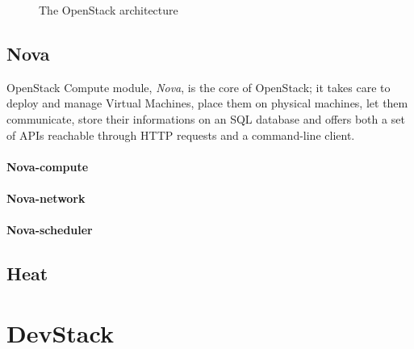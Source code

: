 \begin{figure}[!ht]
\label{fig:openstack_arch}
\caption{The OpenStack architecture}
\end{figure}

\subsection{Nova}
\label{sec:openstack_nova}
OpenStack Compute module, \textit{Nova}, is the core of OpenStack; it takes care to deploy and manage Virtual Machines, place them on physical machines, let them communicate, store their informations on an SQL database and offers both a set of APIs reachable through HTTP requests and a command-line client.

\paragraph{Nova-compute}
\paragraph{Nova-network}
\paragraph{Nova-scheduler}

\subsection{Heat}
\label{sec:openstack_heat}



\section{DevStack}
\label{sec:devstack}

 